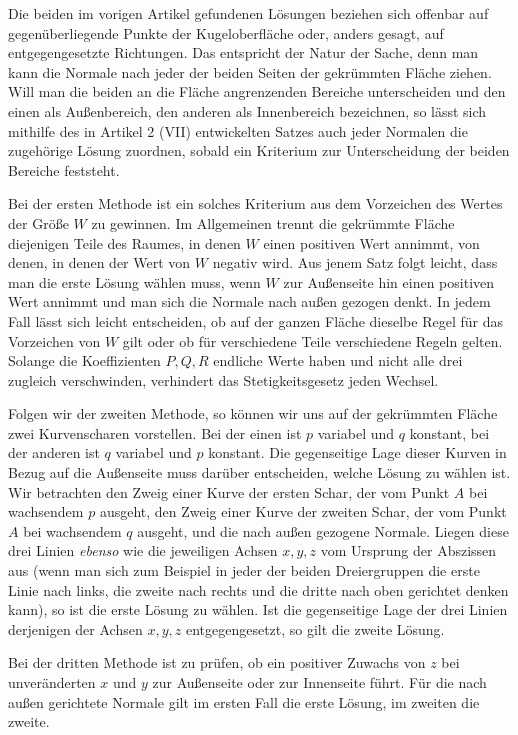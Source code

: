 %
\indent Die beiden im vorigen Artikel gefundenen Lösungen beziehen sich offenbar auf gegenüberliegende Punkte der Kugeloberfläche oder, anders gesagt, auf entgegengesetzte Richtungen. Das entspricht der Natur der Sache, denn man kann die Normale nach jeder der beiden Seiten der gekrümmten Fläche ziehen. Will man die beiden an die Fläche angrenzenden Bereiche unterscheiden und den einen als Außenbereich, den anderen als Innenbereich bezeichnen, so lässt sich mithilfe des in Artikel 2 (VII) entwickelten Satzes auch jeder Normalen die zugehörige Lösung zuordnen, sobald ein Kriterium zur Unterscheidung der beiden Bereiche feststeht.

Bei der ersten Methode ist ein solches Kriterium aus dem Vorzeichen des Wertes der Größe \(W\) zu gewinnen. Im Allgemeinen trennt die gekrümmte Fläche diejenigen Teile des Raumes, in denen \(W\) einen positiven Wert annimmt, von denen, in denen der Wert von \(W\) negativ wird. Aus jenem Satz folgt leicht, dass man die erste Lösung wählen muss, wenn \(W\) zur Außenseite hin einen positiven Wert annimmt und man sich die Normale nach außen gezogen denkt. In jedem Fall lässt sich leicht entscheiden, ob auf der ganzen Fläche dieselbe Regel für das Vorzeichen von \(W\) gilt oder ob für verschiedene Teile verschiedene Regeln gelten. Solange die Koeffizienten \(P,Q,R\) endliche Werte haben und nicht alle drei zugleich verschwinden, verhindert das Stetigkeitsgesetz jeden Wechsel.

Folgen wir der zweiten Methode, so können wir uns auf der gekrümmten Fläche zwei Kurvenscharen vorstellen. Bei der einen ist \(p\) variabel und \(q\) konstant, bei der anderen ist \(q\) variabel und \(p\) konstant. Die gegenseitige Lage dieser Kurven in Bezug auf die Außenseite muss darüber entscheiden, welche Lösung zu wählen ist. Wir betrachten den Zweig einer Kurve der ersten Schar, der vom Punkt \(A\) bei wachsendem \(p\) ausgeht, den Zweig einer Kurve der zweiten Schar, der vom Punkt \(A\) bei wachsendem \(q\) ausgeht, und die nach außen gezogene Normale. Liegen diese drei Linien \textit{ebenso} wie die jeweiligen Achsen \(x,y,z\) vom Ursprung der Abszissen aus (wenn man sich zum Beispiel in jeder der beiden Dreiergruppen die erste Linie nach links, die zweite nach rechts und die dritte nach oben gerichtet denken kann), so ist die erste Lösung zu wählen. Ist die gegenseitige Lage der drei Linien derjenigen der Achsen \(x,y,z\) entgegengesetzt, so gilt die zweite Lösung.

Bei der dritten Methode ist zu prüfen, ob ein positiver Zuwachs von \(z\) bei unveränderten \(x\) und \(y\) zur Außenseite oder zur Innenseite führt. Für die nach außen gerichtete Normale gilt im ersten Fall die erste Lösung, im zweiten die zweite.
